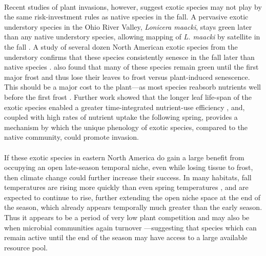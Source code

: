 \documentclass[11pt,a4paper,oneside]{article}
\begin{document}
\\
Recent studies of plant invasions, however, suggest exotic species may not play by the same risk-investment rules as native species in the fall. A pervasive exotic understory species in the Ohio River Valley, \emph{Lonicera maacki}, stays green later than any native understory species, allowing mapping of \emph{L. maacki} by satellite in the fall \citep{becker2013}. A study of several dozen North American exotic species from the understory confirms that these species consistently senesce in the fall later than native species \citep{Fridley:2012fj}. \citet{Fridley:2012fj} also found that many of these species remain green until the first major frost and thus lose their leaves to frost versus plant-induced senescence. This should be a major cost to the plant---as most species reabsorb nutrients well before the first frost \citep{Lambers:2008jb}. Further work showed that the longer leaf life-span of the exotic species enabled a greater time-integrated nutrient-use efficiency \citep{Heberling2013}, and, coupled with high rates of nutrient uptake the following spring, provides a mechanism by which the unique phenology of exotic species, compared to the native community, could promote invasion. \\
\\
If these exotic species in eastern North America do gain a large benefit from occupying an open late-season temporal niche, even while losing tissue to frost, then climate change could further increase their success. In many habitats, fall temperatures are rising more quickly than even spring temperatures \citep{cohen2012}, and are expected to continue to rise, further extending the open niche space at the end of the season, which already appears temporally much greater than the early season. Thus it appears to be a period of very low plant competition and may also be when microbial communities again turnover \citep{Bardgett:2005ls}---suggesting that species which can remain active until the end of the season may have access to a large available resource pool. \\
\\
\end{document}
